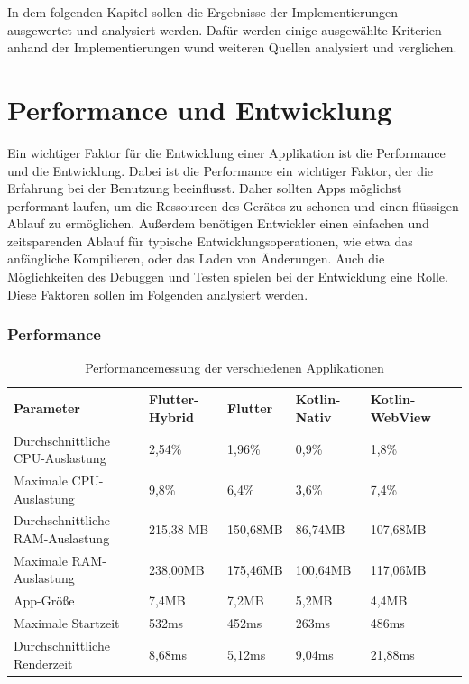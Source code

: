In dem folgenden Kapitel sollen die Ergebnisse der Implementierungen ausgewertet und analysiert werden. Dafür werden einige ausgewählte Kriterien anhand der Implementierungen wund weiteren Quellen analysiert und verglichen.

\section{Performance und Entwicklung}
Ein wichtiger Faktor für die Entwicklung einer Applikation ist die Performance und die Entwicklung. Dabei ist die Performance ein wichtiger Faktor, der die Erfahrung bei der Benutzung beeinflusst. Daher sollten Apps möglichst performant laufen, um die Ressourcen des Gerätes zu schonen und einen flüssigen Ablauf zu ermöglichen. Außerdem benötigen Entwickler einen einfachen und zeitsparenden Ablauf für typische Entwicklungsoperationen, wie etwa das anfängliche Kompilieren, oder das Laden von Änderungen. Auch die Möglichkeiten des Debuggen und Testen spielen bei der Entwicklung eine Rolle. Diese Faktoren sollen im Folgenden analysiert werden.

\subsubsection{Performance}

\begin{table}[ht]
\centering
\caption{Performancemessung der verschiedenen Applikationen}
\begin{tabular}{ |p{4cm}||p{3cm}|p{2cm}|p{2cm}|p{2cm}|p{2cm}| }
 \hline
 Parameter & Flutter-Hybrid & Flutter & Kotlin-Nativ & Kotlin-WebView \\
 \hline
 Durchschnittliche CPU-Auslastung       &   2,54\%&   1,96\%& 0,9\%& 1,8\%\\
  \hline
 Maximale CPU- Auslastung  & 9,8\%& 6,4\%& 3,6\%& 7,4\%\\
  \hline
 Durchschnittliche RAM-Auslastung & 215,38 MB& 150,68MB& 86,74MB& 107,68MB\\
  \hline
 Maximale RAM- Auslastung & 238,00MB& 175,46MB& 100,64MB& 117,06MB\\
  \hline
 App-Größe & 7,4MB& 7,2MB& 5,2MB& 4,4MB\\
  \hline
 Maximale Startzeit & 532ms& 452ms& 263ms& 486ms\\
 \hline
 Durchschnittliche Renderzeit &8,68ms& 5,12ms& 9,04ms& 21,88ms\\
 \hline
\end{tabular}
\label{tab:evaluations_performance}
\end{table}


